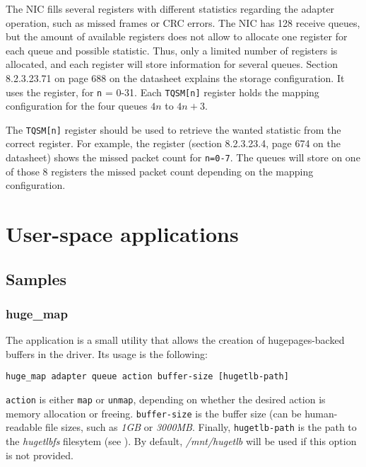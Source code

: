 \documentclass[oneside]{hpman}
\begin{document}
The NIC fills several registers with different statistics regarding the adapter operation, such as missed frames or CRC errors. The NIC has 128 receive queues, but the amount of available registers does not allow to allocate one register for each queue and possible statistic. Thus, only a limited number of registers is allocated, and each register will store information for several queues. Section 8.2.3.23.71 on page 688 on the datasheet explains the storage configuration. It uses the  register, for \texttt{n} = 0-31. Each \texttt{TQSM[n]} register holds the mapping configuration for the four queues $4n$ to $4n + 3$.

The \texttt{TQSM[n]} register should be used to retrieve the wanted statistic from the correct register. For example, the  register (section 8.2.3.23.4, page 674 on the datasheet) shows the missed packet count for \texttt{n=0-7}. The queues will store on one of those 8 registers the missed packet count depending on the mapping configuration.

\chapter{User-space applications}

\section{Samples}
\label{sec:samples}

\subsection{huge\_map}
\label{sec:samples:hugemap}

The  application is a small utility that allows the creation of hugepages-backed buffers in the driver. Its usage is the following:

\begin{verbatim}
huge_map adapter queue action buffer-size [hugetlb-path]
\end{verbatim}

\texttt{action} is either \texttt{map} or \texttt{unmap}, depending on whether the desired action is memory allocation or freeing. \texttt{buffer-size} is the buffer size (can be human-readable file sizes, such as \textit{1GB} or \textit{3000MB}. Finally, \texttt{hugetlb-path} is the path to the \textit{hugetlbfs} filesytem (see ). By default, \textit{/mnt/hugetlb} will be used if this option is not provided.
\end{document}
